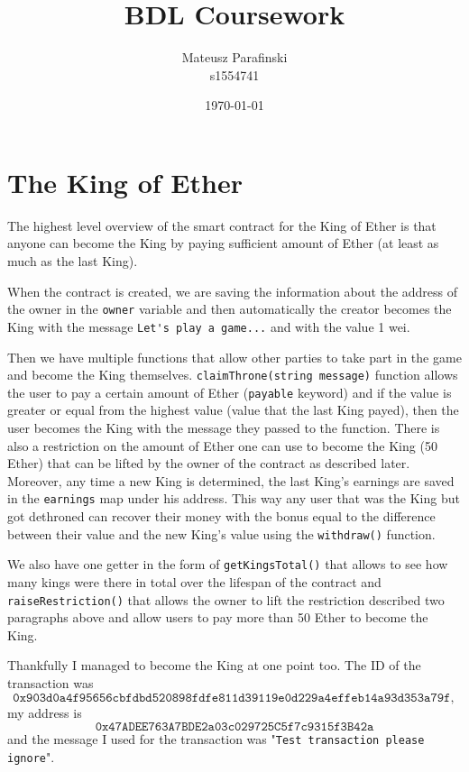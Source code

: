 \documentclass{article}
\title{BDL Coursework}
\author{Mateusz Parafinski\\\small s1554741}
\date{\today}
\begin{document}
    \maketitle

    \section{The King of Ether}
    The highest level overview of the smart contract for the
    King of Ether is that anyone can become the King by
    paying sufficient amount of Ether (at least as much as
    the last King).
    \newline

    \noindent When the contract is created, we are saving
    the information about the address of the owner in the
    \verb|owner| variable and then automatically the creator
    becomes the King with the message \verb|Let's play a game...| 
    and with the value 1 wei.
    \newline

    \noindent Then we have multiple functions that allow
    other parties to take part in the game and become the
    King themselves. \verb|claimThrone(string message)|
    function allows the user to pay a certain amount of
    Ether (\verb|payable| keyword) and if the value is
    greater or equal from the highest value (value that the
    last King payed), then the user becomes the King with
    the message they passed to the function. There is also a
    restriction on the amount of Ether one can use to become
    the King (50 Ether) that can be lifted by the owner of
    the contract as described later. Moreover, any time a
    new King is determined, the last King's earnings are
    saved in the \verb|earnings| map under his address. This
    way any user that was the King but got dethroned can
    recover their money with the bonus equal to the
    difference between their value and the new King's value
    using the \verb|withdraw()| function.
    \newline

    \noindent We also have one getter in the form of
    \verb|getKingsTotal()| that allows to see how many kings
    were there in total over the lifespan of the contract
    and \verb|raiseRestriction()| that allows the owner to
    lift the restriction described two paragraphs above and
    allow users to pay more than 50 Ether to become the
    King.
    \newline

    \noindent Thankfully I managed to become the King at one
    point too. The ID of the transaction was 
    \[
        \texttt{0x903d0a4f95656cbfdbd520898fdfe811d39119e0d229a4effeb14a93d353a79f},
    \]
    my address is
    \[
        \texttt{0x47ADEE763A7BDE2a03c029725C5f7c9315f3B42a}
    \]
    and the message I used for the transaction was
    "\verb|Test transaction please ignore|".
\end{document}
